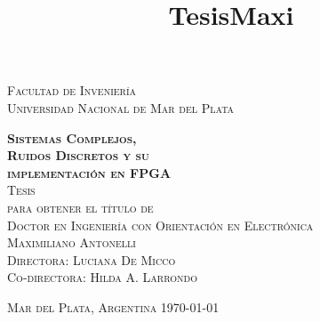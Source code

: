 

\title{TesisMaxi} %

\begin{titlepage}

\begin{center}
	
\textsc{\Large Facultad de Inveniería \\ Universidad Nacional de Mar del Plata}\\[4em]

\vspace{4em}

\textsc{\Huge \textbf{Sistemas Complejos,\\Ruidos Discretos y su\\[.7em]implementación en FPGA}}\\[4em]

\textsc{\large Tesis}\\[3em]

\textsc{para obtener el título de}\\[1em]

\textsc{Doctor en Ingeniería con Orientación en Electrónica}\\[1em]


\textsc{\Large Maximiliano Antonelli}\\[4em]

\textsc{Directora: Luciana De Micco\\ Co-directora: Hilda A. Larrondo}

\vfill

\textsc{Mar del Plata, Argentina \hfill \today}

\end{center}

\end{titlepage}